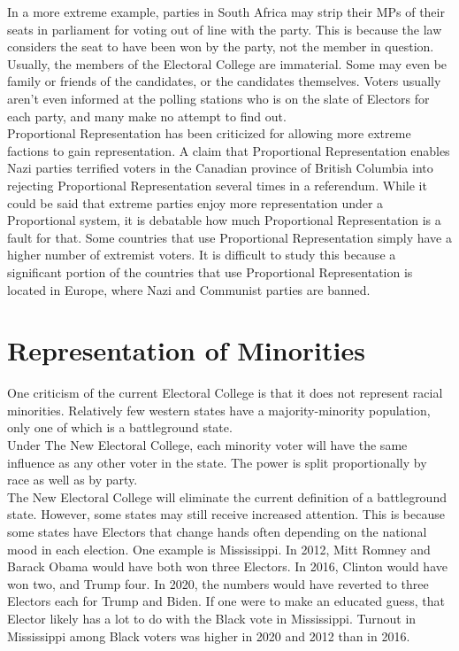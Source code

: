 \documentclass{article}
\begin{document}
    In a more extreme example, parties in South Africa may strip their MPs of their seats in parliament for voting out of line with the party. This is because the law considers the seat to have been won by the party, not the member in question.\\

    Usually, the members of the Electoral College are immaterial. Some may even be family or friends of the candidates, or the candidates themselves. Voters usually aren't even informed at the polling stations who is on the slate of Electors for each party, and many make no attempt to find out.\\

    Proportional Representation has been criticized for allowing more extreme factions to gain representation. A claim that Proportional Representation enables Nazi parties terrified voters in the Canadian province of British Columbia into rejecting Proportional Representation several times in a referendum. While it could be said that extreme parties enjoy more representation under a Proportional system, it is debatable how much Proportional Representation is a fault for that. Some countries that use Proportional Representation simply have a higher number of extremist voters. It is difficult to study this because a significant portion of the countries that use Proportional Representation is located in Europe, where Nazi and Communist parties are banned.\\

    \section{Representation of Minorities}%

    One criticism of the current Electoral College is that it does not represent racial minorities. Relatively few western states have a majority-minority population, only one of which is a battleground state.\\

    Under The New Electoral College, each minority voter will have the same influence as any other voter in the state. The power is split proportionally by race as well as by party.\\

    The New Electoral College will eliminate the current definition of a battleground state. However, some states may still receive increased attention. This is because some states have Electors that change hands often depending on the national mood in each election. One example is Mississippi. In 2012, Mitt Romney and Barack Obama would have both won three Electors. In 2016, Clinton would have won two, and Trump four. In 2020, the numbers would have reverted to three Electors each for Trump and Biden. If one were to make an educated guess, that Elector likely has a lot to do with the Black vote in Mississippi. Turnout in Mississippi among Black voters was higher in 2020 and 2012 than in 2016.\\
\end{document}
